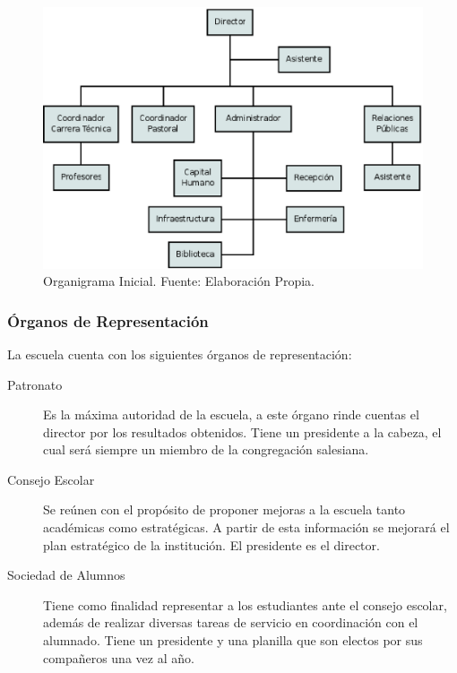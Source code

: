 \begin{figure}
	\centering
	\includegraphics[scale=0.7]{images/organigrama-inicial}
	\caption{Organigrama Inicial. Fuente: Elaboración Propia.}
	\label{fig:Org:Inicial}
\end{figure}


\clearpage

\subsubsection{Órganos de Representación}

La escuela cuenta con los siguientes órganos de representación:

\begin{description}
	\item[Patronato]
		Es la máxima autoridad de la escuela, a este órgano rinde cuentas el director por los resultados obtenidos. Tiene un presidente a la cabeza, el cual será siempre un miembro de la congregación salesiana.
	\item[Consejo Escolar]
		Se reúnen con el propósito de proponer mejoras a la escuela tanto académicas como estratégicas. A partir de esta información se mejorará el plan estratégico de la institución. El presidente es el director.
	\item[Sociedad de Alumnos]
		Tiene como finalidad representar a los estudiantes ante el consejo escolar, además de realizar diversas tareas de servicio en coordinación con el alumnado. Tiene un presidente y una planilla que son electos por sus compañeros una vez al año.
\end{description}


